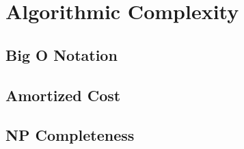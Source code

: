 \section{Algorithmic Complexity}

\subsection{Big O Notation}

\subsection{Amortized Cost}

\subsection{NP Completeness}

